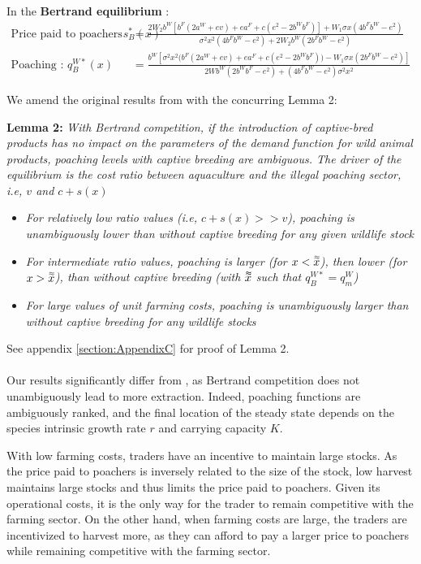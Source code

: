 In the \textbf{Bertrand equilibrium }:
\begin{align}
    \text{Price paid to poachers  }
 s_B^*(x) &=\frac{2 W_2 b^W[b^F(2a^W + ev) + e a^F + c(e^2 - 2b^Wb^F)] + W_1 \sigma x (4b^Fb^W - e^2)}{\sigma^2 x^2 (4b^F b^W - e^2) + 2 W_2 b^W(2b^F b^W - e^2)}\\
    \text{Poaching : }q^{W*}_B(x) &= \frac{b^W[\sigma^2 x^2 \big(b^F (2a^W + ev) + ea^F + c(e^2 - 2b^Wb^F)\big) - W_1 \sigma x (2b^F b^W - e^2)]}{2Wb^W (2b^Wb^F - e^2) + (4b^Fb^W - e^2) \sigma^2 x^2}
    \label{eq:poaching_bertrand}
\end{align}

We amend the original results from \cite{damania_economics_2007} with the concurring Lemma 2:
\begin{displayquote}
    \textbf{Lemma 2:} \textit{With Bertrand competition, if the introduction of captive-bred products has no impact on the parameters of the demand function for wild animal products, poaching levels  with captive breeding are ambiguous. The driver of the equilibrium is the cost ratio between aquaculture and the illegal poaching sector, i.e, $v$ and $c +s(x)$}

    \begin{itemize}
        \item \textit{For relatively low ratio values (i.e, $c + s(x) >> v$), poaching is unambiguously lower than without captive breeding for any given wildlife stock}
        \item \textit{For intermediate ratio values, poaching is larger (for $x<\accentset{\approx}{x}$), then lower (for $x>\accentset{\approx}{x}$), than without captive breeding (with $\accentset{\approx}{x}$ such that $q^{W*}_B=q^W_m$)}
        \item \textit{For large values of unit farming costs, poaching is unambiguously larger than without captive breeding for any wildlife stocks}
    \end{itemize}
\end{displayquote}
See appendix \ref{section:AppendixC} for proof of Lemma 2.
\\\\
Our results significantly differ from \cite{damania_economics_2007}, as Bertrand competition does not unambiguously lead to more extraction. Indeed, poaching functions are ambiguously ranked, and the final location of the steady state depends on the species intrinsic growth rate $r$ and carrying capacity $K$.

With low farming costs, traders have an incentive to maintain large stocks. 
As the price paid to poachers is inversely related to the size of the stock, low harvest maintains large stocks and thus limits the price paid to poachers. Given its operational costs, it is the only way for the trader to remain competitive with the farming sector. 
On the other hand, when farming costs are large, the traders are incentivized to harvest more, as they can afford to pay a larger price to poachers while remaining competitive with the farming sector. 
\\
